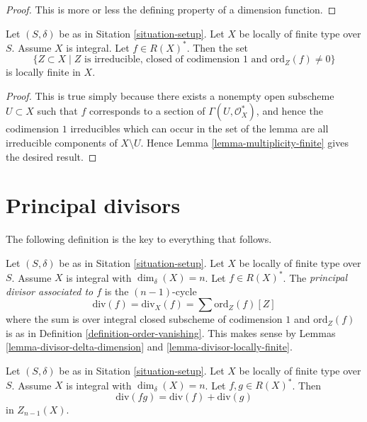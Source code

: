 \begin{proof}
This is more or less the defining property of a dimension function.
\end{proof}

\begin{lemma}
\label{lemma-divisor-locally-finite}
Let $(S, \delta)$ be as in Sitation \ref{situation-setup}.
Let $X$ be locally of finite type over $S$. Assume $X$ is
integral. Let $f \in R(X)^*$. Then the set
$$
\{Z \subset X \mid Z \text{ is irreducible, closed of codimension }1
\text{ and }\text{ord}_Z(f) \not = 0\}
$$
is locally finite in $X$.
\end{lemma}

\begin{proof}
This is true simply because there exists a nonempty open subscheme
$U \subset X$ such that $f$ corresponds to a section of
$\Gamma(U, \mathcal{O}_X^*)$, and hence the codimension $1$
irreducibles which can occur in the set of the lemma are all
irreducible components of $X \setminus U$.
Hence Lemma \ref{lemma-multiplicity-finite} gives the desired result.
\end{proof}


\section{Principal divisors}
\label{section-principal-divisors}

\noindent
The following definition is the key to everything that follows.

\begin{definition}
\label{definition-principal-divisor}
Let $(S, \delta)$ be as in Sitation \ref{situation-setup}.
Let $X$ be locally of finite type over $S$. Assume $X$ is
integral with $\dim_\delta(X) = n$.
Let $f \in R(X)^*$. The {\it principal divisor
associated to $f$} is the $(n - 1)$-cycle
$$
\text{div}(f) = \text{div}_X(f) = \sum \text{ord}_Z(f) [Z]
$$
where the sum is over integral closed subscheme of
codimension $1$ and $\text{ord}_Z(f)$ is as in
Definition \ref{definition-order-vanishing}. This makes sense
by Lemmas \ref{lemma-divisor-delta-dimension} and
\ref{lemma-divisor-locally-finite}.
\end{definition}


\begin{lemma}
\label{lemma-div-additive}
Let $(S, \delta)$ be as in Sitation \ref{situation-setup}.
Let $X$ be locally of finite type over $S$. Assume $X$ is
integral with $\dim_\delta(X) = n$.
Let $f, g \in R(X)^*$.
Then
$$
\text{div}(fg) = \text{div}(f) + \text{div}(g)
$$
in $Z_{n - 1}(X)$.
\end{lemma}

